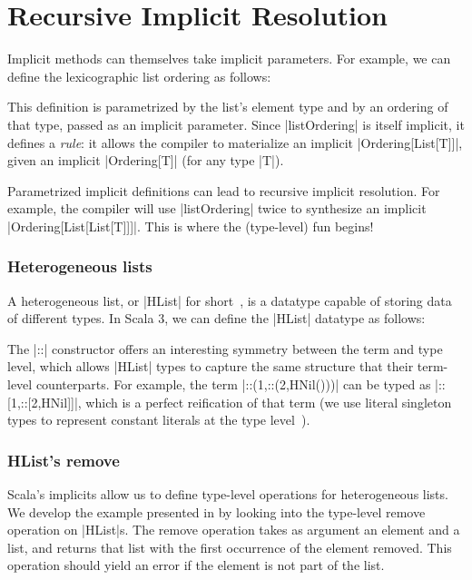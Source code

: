 \section{Recursive Implicit Resolution}

Implicit methods can themselves take implicit parameters.
For example, we can define the lexicographic list ordering as follows:

\ordListExample

\noindent
This definition is parametrized by the list's element type and by an ordering of that type, passed as an implicit parameter.
Since |listOrdering| is itself implicit, it defines a \emph{rule}: it allows the compiler to materialize an implicit |Ordering[List[T]]|, given an implicit |Ordering[T]| (for any type |T|).

Parametrized implicit definitions can lead to recursive implicit resolution. For example, the compiler will use |listOrdering| twice to synthesize an implicit |Ordering[List[List[T]]]|.
This is where the (type-level) fun begins!

\subsubsection{Heterogeneous lists}

A heterogeneous list, or |HList| for short~\citep{kiselyov2004strongly}, is a datatype capable of storing data of different types.
In Scala 3, we can define the |HList| datatype as follows:

\hlistEnumDefinition

\noindent
The |::| constructor offers an interesting symmetry between the term and type level, which allows |HList| types to capture the same structure that their term-level counterparts.
For example, the term |::(1,::(2,HNil()))| can be typed as |::[1,::[2,HNil]]|, which is a perfect reification of that term (we use literal singleton types to represent constant literals at the type level~\citep{leontiev2014sip}).

\subsubsection{HList's remove}
\label{sec:hlists-remove}

Scala's implicits allow us to define type-level operations for heterogeneous lists.
We develop the example presented in  by looking into the type-level remove operation on |HList|s.
The remove operation takes as argument an element and a list, and returns that list with the first occurrence of the element removed.
This operation should yield an error if the element is not part of the list.

